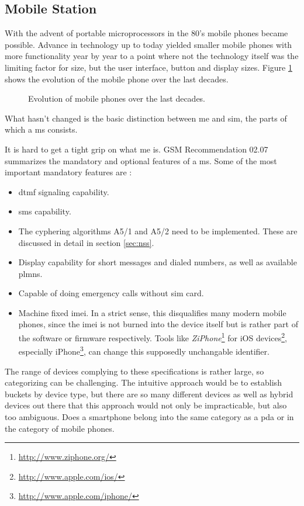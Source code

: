 \subsection{Mobile Station}
\label{sec:ms}
With the advent of portable microprocessors in the 80's mobile phones became possible.
Advance in technology up to today yielded smaller mobile phones with more functionality year by year to a point where not the technology itself was the limiting factor for size, but the user interface, \eg button and display sizes.
Figure \ref{fig:phones} shows the evolution of the mobile phone over the last decades.
\begin{figure}
\caption{Evolution of mobile phones over the last decades.}
\label{fig:phones}
\end{figure}
What hasn't changed is the basic distinction between \gls{me} and \gls{sim}, the parts of which a \gls{ms} consists.

It is hard to get a tight grip on what \gls{me} is.
GSM Recommendation 02.07 \cite{GSM0207} summarizes the mandatory and optional features of a \gls{ms}.
Some of the most important mandatory features are \cite{protocols1999}:
\begin{itemize}
	\item \gls{dtmf} signaling capability.
	\item \gls{sms} capability.
	\item The cyphering algorithms A5/1 and A5/2 need to be implemented. 
	These are discussed in detail in section \ref{sec:nss}.
	\item Display capability for short messages and dialed numbers, as well as available \gls{plmn}s.
	\item Capable of doing emergency calls without \gls{sim} card.
	\item Machine fixed \gls{imei}.
	In a strict sense, this disqualifies many modern mobile phones, since the \gls{imei} is not burned into the device itself but is rather part of the software or firmware respectively.
	Tools like \emph{ZiPhone}\footnote{\url{http://www.ziphone.org/}} for iOS devices\footnote{\url{http://www.apple.com/ios/}}, especially iPhone\footnote{\url{http://www.apple.com/iphone/}}, can change this supposedly unchangable identifier.
\end{itemize}

The range of devices complying to these specifications is rather large, so categorizing can be challenging.
The intuitive approach would be to establish buckets by device type, but there are so many different devices as well as hybrid devices out there that this approach would not only be impracticable, but also too ambiguous.
Does a smartphone belong into the same category as a \gls{pda} or in the category of mobile phones.

